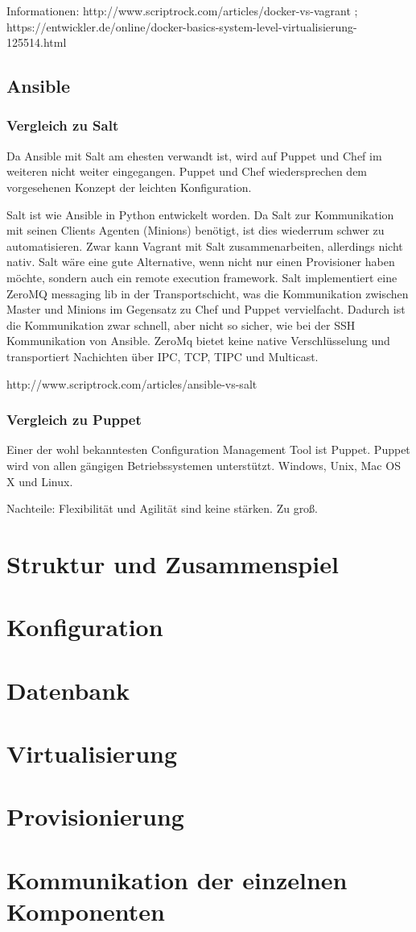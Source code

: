Informationen: http://www.scriptrock.com/articles/docker-vs-vagrant ; https://entwickler.de/online/docker-basics-system-level-virtualisierung-125514.html\newline

\subsection{Ansible}
\subsubsection{Vergleich zu Salt}
Da Ansible mit Salt am ehesten verwandt ist, wird auf Puppet und Chef im weiteren nicht weiter eingegangen.
Puppet und Chef wiedersprechen dem vorgesehenen Konzept der leichten Konfiguration.

Salt ist wie Ansible in Python entwickelt worden. Da Salt zur Kommunikation mit seinen Clients Agenten (Minions) benötigt, ist dies wiederrum schwer zu automatisieren. Zwar kann Vagrant mit Salt zusammenarbeiten, allerdings nicht nativ. Salt wäre eine gute Alternative, wenn nicht nur einen Provisioner haben möchte, sondern auch ein remote execution framework.
Salt implementiert eine ZeroMQ messaging lib in der Transportschicht, was die Kommunikation zwischen Master und Minions im Gegensatz zu Chef und Puppet vervielfacht. Dadurch ist die Kommunikation zwar schnell, aber nicht so sicher, wie bei der SSH Kommunikation von Ansible. 
ZeroMq bietet keine native Verschlüsselung und transportiert Nachichten über IPC, TCP, TIPC und Multicast.



http://www.scriptrock.com/articles/ansible-vs-salt

\subsubsection{Vergleich zu Puppet}
Einer der wohl bekanntesten Configuration Management Tool ist Puppet.
Puppet wird von allen gängigen Betriebssystemen unterstützt. Windows, Unix, Mac OS X und Linux. 

Nachteile: Flexibilität und Agilität sind keine stärken. Zu groß. 



\section{Struktur und Zusammenspiel}
\section{Konfiguration}

\section{Datenbank}
\section{Virtualisierung}
\section{Provisionierung}
\section{Kommunikation der einzelnen Komponenten}